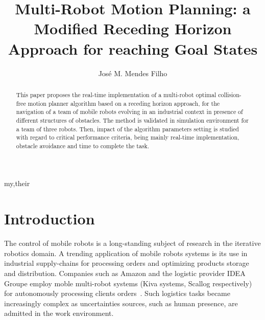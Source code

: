 \documentclass[eprint]{actapoly}
\begin{document}
\title[Trajectory Generation Approach]
{Multi-Robot Motion Planning: a Modified Receding Horizon Approach for reaching Goal States}

\author[J. M. Mendes Filho]{Jos\'{e} M. Mendes Filho}{my,their}


\begin{abstract}

 This paper proposes the real-time implementation of a multi-robot optimal collision-free motion planner
 algorithm based on a receding horizon approach, for the navigation of a team of mobile
 robots evolving in an industrial context in presence of different structures of obstacles.
 The method is validated in simulation environment for a team of three robots. Then, impact of the algorithm
 parameters setting is studied with regard to critical performance criteria, being mainly real-time implementation,
 obstacle avoidance and time to complete the task.
 
\end{abstract}


\maketitle




\section{Introduction}\label{sec:intro}






The %
control of mobile robots is a long-standing subject of research 
in the iterative robotics domain. A trending application of mobile robots systems
is its use in industrial supply-chains for processing orders and optimizing products storage and distribution. Companies such as Amazon and the logistic provider IDEA Groupe employ moble multi-robot systems (Kiva systems, Scallog respectively) for autonomously processing clients orders~\cite{Gizmag,supplychain}.
Such logistics tasks became increasingly complex as uncertainties sources, such as human presence, are admitted in the work environment.
\end{document}
